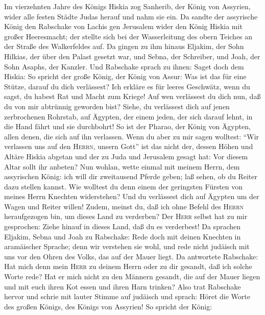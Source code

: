  Im vierzehnten Jahre des Königs Hiskia zog Sanherib, der
König von Assyrien, wider alle festen Städte Judas herauf und nahm sie
ein.  Da sandte der assyrische König den Rabschake von
Lachis gen Jerusalem wider den König Hiskia mit großer Heeresmacht; der
stellte sich bei der Wasserleitung des obern Teiches an der Straße des
Walkerfeldes auf.  Da gingen zu ihm hinaus Eljakim, der
Sohn Hilkias, der über den Palast gesetzt war, und Sebna, der Schreiber,
und Joah, der Sohn Asaphs, der Kanzler.  Und Rabschake
sprach zu ihnen: Saget doch dem Hiskia: So spricht der große König, der
König von Assur: Was ist das für eine Stütze, darauf du dich verlässest?
 Ich erkläre es für leeres Geschwätz, wenn du sagst, du
habest Rat und Macht zum Kriege! Auf wen verlässest du dich nun, daß du
von mir abtrünnig geworden bist?  Siehe, du verlässest
dich auf jenen zerbrochenen Rohrstab, auf Ägypten, der einem jeden, der
sich darauf lehnt, in die Hand fährt und sie durchbohrt! So ist der
Pharao, der König von Ägypten, allen denen, die sich auf ihn verlassen.
 Wenn du aber zu mir sagen wolltest: ``Wir verlassen uns
auf den \textsc{Herrn}, unsern Gott'' ist das nicht der, dessen Höhen
und Altäre Hiskia abgetan und der zu Juda und Jerusalem gesagt hat: Vor
diesem Altar sollt ihr anbeten?  Nun wohlan, wette einmal
mit meinem Herrn, dem assyrischen König: ich will dir zweitausend Pferde
geben; laß sehen, ob du Reiter dazu stellen kannst.  Wie
wolltest du denn einem der geringsten Fürsten von meines Herrn Knechten
widerstehen? Und du verlässest dich auf Ägypten um der Wagen und Reiter
willen!  Zudem, meinst du, daß ich ohne Befehl des
\textsc{Herrn} heraufgezogen bin, um dieses Land zu verderben? Der
\textsc{Herr} selbst hat zu mir gesprochen: Ziehe hinauf in dieses Land,
daß du es verderbest!  Da sprachen Eljakim, Sebna und
Joah zu Rabschake: Rede doch mit deinen Knechten in aramäischer Sprache;
denn wir verstehen sie wohl, und rede nicht judäisch mit uns vor den
Ohren des Volks, das auf der Mauer liegt.  Da antwortete
Rabschake: Hat mich denn mein \textsc{Herr} zu deinem Herrn oder zu dir
gesandt, daß ich solche Worte rede? Hat er mich nicht zu den Männern
gesandt, die auf der Mauer liegen und mit euch ihren Kot essen und ihren
Harn trinken?  Also trat Rabschake hervor und schrie mit
lauter Stimme auf judäisch und sprach: Höret die Worte des großen
Königs, des Königs von Assyrien!  So spricht der König:
